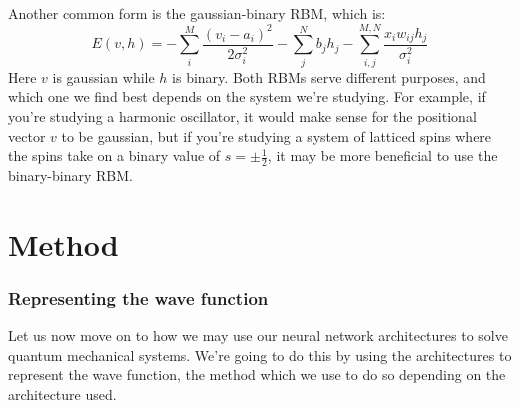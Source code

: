 \documentclass[12pt]{article}
\begin{document}
{\newline
Another common form is the gaussian-binary RBM, which is:
\begin{equation*}
    E(v, h) = - \sum_i^M \frac{(v_i - a_i)^2}{2 \sigma_i^2} - \sum_j^N b_j h_j - \sum_{i,j}^{M,N}  \frac{x_i w_{ij}h_j}{\sigma_i^2}
\end{equation*}
Here $v$ is gaussian while $h$ is binary.
\newline
Both RBMs serve different purposes, and which one we find best depends on the system we're studying. For example, if you're studying a harmonic oscillator, it would make sense for the positional vector $v$ to be gaussian, but if you're studying a system of latticed spins where the spins take on a binary value of $s = \pm \frac{1}{2}$, it may be more beneficial to use the binary-binary RBM.
\newpage
~\newpage
\part{Method}
\section{Representing the wave function}
Let us now move on to how we may use our neural network architectures to solve quantum mechanical systems. We're going to do this by using the architectures to represent the wave function, the method which we use to do so depending on the architecture used.
}
\end{document}
